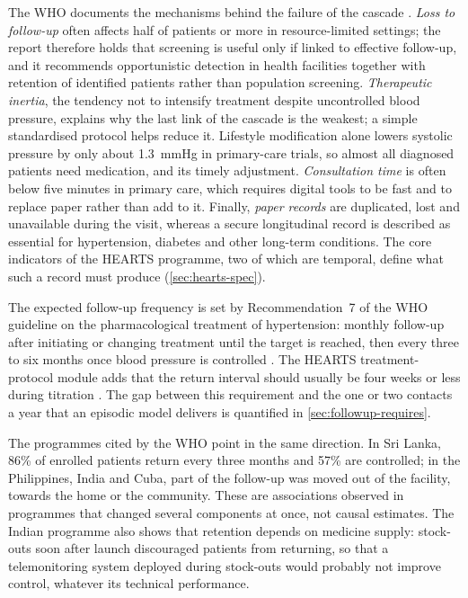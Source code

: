 \documentclass[12pt,a4paper,oneside]{report}
\begin{document}
The WHO documents the mechanisms behind the failure of the cascade \parencite{who2023hypertension}. \emph{Loss to follow-up} often affects half of patients or more in resource-limited settings; the report therefore holds that screening is useful only if linked to effective follow-up, and it recommends opportunistic detection in health facilities together with retention of identified patients rather than population screening. \emph{Therapeutic inertia}, the tendency not to intensify treatment despite uncontrolled blood pressure, explains why the last link of the cascade is the weakest; a simple standardised protocol helps reduce it. Lifestyle modification alone lowers systolic pressure by only about 1.3~mmHg in primary-care trials, so almost all diagnosed patients need medication, and its timely adjustment. \emph{Consultation time} is often below five minutes in primary care, which requires digital tools to be fast and to replace paper rather than add to it. Finally, \emph{paper records} are duplicated, lost and unavailable during the visit, whereas a secure longitudinal record is described as essential for hypertension, diabetes and other long-term conditions. The core indicators of the HEARTS programme, two of which are temporal, define what such a record must produce (\cref{sec:hearts-spec}).

The expected follow-up frequency is set by Recommendation~7 of the WHO guideline on the pharmacological treatment of hypertension: monthly follow-up after initiating or changing treatment until the target is reached, then every three to six months once blood pressure is controlled \parencite{who2021guideline}. The HEARTS treatment-protocol module adds that the return interval should usually be four weeks or less during titration \parencite{whoHEARTS}. The gap between this requirement and the one or two contacts a year that an episodic model delivers is quantified in \cref{sec:followup-requires}.

The programmes cited by the WHO point in the same direction. In Sri Lanka, 86\% of enrolled patients return every three months and 57\% are controlled; in the Philippines, India and Cuba, part of the follow-up was moved out of the facility, towards the home or the community. These are associations observed in programmes that changed several components at once, not causal estimates. The Indian programme also shows that retention depends on medicine supply: stock-outs soon after launch discouraged patients from returning, so that a telemonitoring system deployed during stock-outs would probably not improve control, whatever its technical performance.
\end{document}
